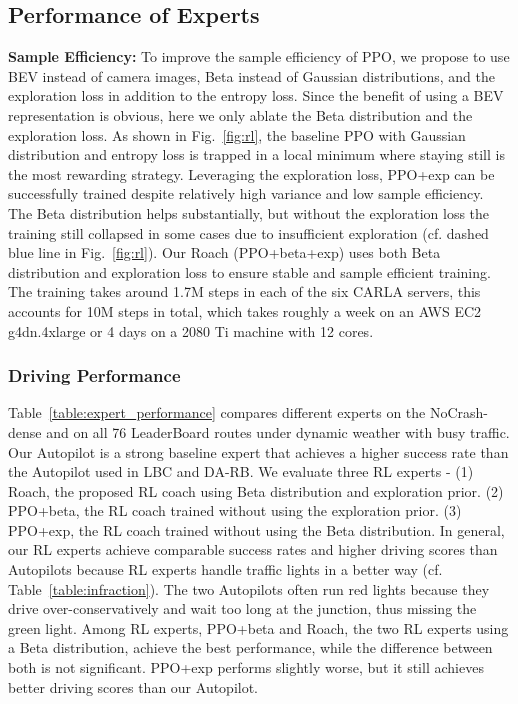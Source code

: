 \subsection{Performance of Experts}

\textbf{\textsf{Sample Efficiency:}}
To improve the sample efficiency of PPO, we propose to use BEV instead of camera images, Beta instead of Gaussian distributions, and the exploration loss in addition to the entropy loss.
Since the benefit of using a BEV representation is obvious, here we only ablate the Beta distribution and the exploration loss.
As shown in Fig.~\ref{fig:rl}, the baseline PPO with Gaussian distribution and entropy loss is trapped in a local minimum where staying still is the most rewarding strategy.
Leveraging the exploration loss, PPO+exp can be successfully trained despite relatively high variance and low sample efficiency.
The Beta distribution helps substantially, but without the exploration loss the training still collapsed in some cases due to insufficient exploration (cf. dashed blue line in Fig.~\ref{fig:rl}).
Our Roach (PPO+beta+exp) uses both Beta distribution and exploration loss to ensure stable and sample efficient training.
The training takes around 1.7M steps in each of the six CARLA servers, this accounts for 10M steps in total, which takes roughly a week on an AWS EC2 g4dn.4xlarge or 4 days on a 2080 Ti machine with 12 cores.



\subsubsection{Driving Performance}

Table~\ref{table:expert_performance} compares different experts on the NoCrash-dense and on all 76 LeaderBoard routes under dynamic weather with busy traffic.
Our Autopilot is a strong baseline expert that achieves a higher success rate than the Autopilot used in LBC and DA-RB.
We evaluate three RL experts - 
(1) Roach, the proposed RL coach using Beta distribution and exploration prior.
(2) PPO+beta, the RL coach trained without using the exploration prior. 
(3) PPO+exp, the RL coach trained without using the Beta distribution.
In general, our RL experts achieve comparable success rates and higher driving scores than Autopilots because RL experts handle traffic lights in a better way (cf. Table~\ref{table:infraction}).
The two Autopilots often run red lights because they drive over-conservatively and wait too long at the junction, thus missing the green light.
Among RL experts, PPO+beta and Roach, the two RL experts using a Beta distribution, achieve the best performance, while the difference between both is not significant. PPO+exp performs slightly worse, but it still achieves better driving scores than our Autopilot. 


